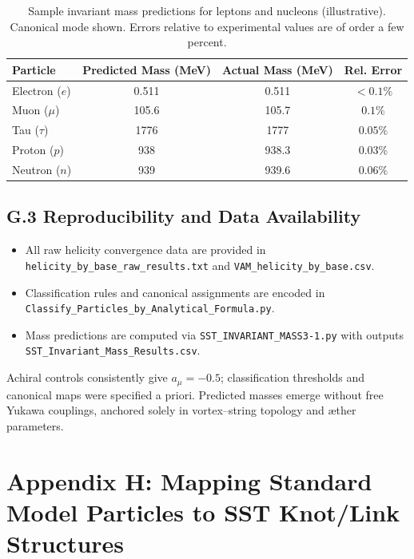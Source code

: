 \documentclass[smallextended]{svjour3}       %
\begin{document}
    \begin{table}[h!]
    \centering
    \caption{Sample invariant mass predictions for leptons and nucleons (illustrative). Canonical mode shown. Errors relative to experimental values are of order a few percent.}
    \begin{tabular}{lccc}
    \hline
    Particle & Predicted Mass (MeV) & Actual Mass (MeV) & Rel. Error \\
    \hline
    Electron ($e$) & 0.511 & 0.511 & $<0.1\%$ \\
    Muon ($\mu$)   & 105.6 & 105.7 & $0.1\%$ \\
    Tau ($\tau$)   & 1776  & 1777  & $0.05\%$ \\
    Proton ($p$)   & 938   & 938.3 & $0.03\%$ \\
    Neutron ($n$)  & 939   & 939.6 & $0.06\%$ \\
    \hline
    \end{tabular}
    \end{table}

\subsection*{G.3 Reproducibility and Data Availability}

    \begin{itemize}
    \item All raw helicity convergence data are provided in {\tt helicity\_by\_base\_raw\_results.txt} and {\tt VAM\_helicity\_by\_base.csv}.
    \item Classification rules and canonical assignments are encoded in {\tt Classify\_Particles\_by\_Analytical\_Formula.py}.
    \item Mass predictions are computed via {\tt SST\_INVARIANT\_MASS3-1.py} with outputs {\tt SST\_Invariant\_Mass\_Results.csv}.
    \end{itemize}

    Achiral controls consistently give $a_\mu=-0.5$; classification thresholds and canonical maps were specified a priori.
    Predicted masses emerge without free Yukawa couplings, anchored solely in vortex–string topology and æther parameters.

\section*{Appendix H: Mapping Standard Model Particles to SST Knot/Link Structures}
\label{sec:sm-to-sst-mapping}
\end{document}
